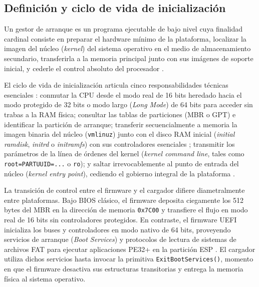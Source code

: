 \documentclass[12pt]{article}
\begin{document}
\subsection{Definición y ciclo de vida de inicialización}
\label{subsec:definicionCicloVidaArranque}

Un gestor de arranque es un programa ejecutable de bajo nivel cuya finalidad cardinal consiste en preparar el hardware mínimo de la plataforma, localizar la imagen del núcleo (\textit{kernel}) del sistema operativo en el medio de almacenamiento secundario, transferirla a la memoria principal junto con sus imágenes de soporte inicial, y cederle el control absoluto del procesador \parencite[\S 2.8, pp.\ 80--82]{stallings2018operating}.

El ciclo de vida de inicialización articula cinco responsabilidades técnicas esenciales \parencite[\S 2.8, pp.\ 80--82]{stallings2018operating}: conmutar la CPU desde el modo real de 16 bits heredado hacia el modo protegido de 32 bits o modo largo (\textit{Long Mode}) de 64 bits para acceder sin trabas a la RAM física; consultar las tablas de particiones (MBR o GPT) e identificar la partición de arranque; transferir secuencialmente a memoria la imagen binaria del núcleo (\texttt{vmlinuz}) junto con el disco RAM inicial (\textit{initial ramdisk}, \textit{initrd} o \textit{initramfs}) con sus controladores esenciales \parencite[\S 12.5.2, p.\ 419]{silberschatz2006fundamentos}; transmitir los parámetros de la línea de órdenes del kernel (\textit{kernel command line}, tales como \texttt{root=PARTUUID=...} o \texttt{ro}); y saltar irrevocablemente al punto de entrada del núcleo (\textit{kernel entry point}), cediendo el gobierno integral de la plataforma \parencite[\S 2.4, p.\ 64]{silberschatz2006fundamentos}.

La transición de control entre el firmware y el cargador difiere diametralmente entre plataformas. Bajo BIOS clásico, el firmware deposita ciegamente los 512 bytes del MBR en la dirección de memoria \texttt{0x7C00} y transfiere el flujo en modo real de 16 bits sin controladores protegidos. En contraste, el firmware UEFI inicializa los buses y controladores en modo nativo de 64 bits, proveyendo servicios de arranque (\textit{Boot Services}) y protocolos de lectura de sistemas de archivos FAT para ejecutar aplicaciones PE32+ en la partición ESP \parencite[\S 2.1, pp.\ 24--26]{uefi2024specification}. El cargador utiliza dichos servicios hasta invocar la primitiva \texttt{ExitBootServices()}, momento en que el firmware desactiva sus estructuras transitorias y entrega la memoria física al sistema operativo.
\end{document}
